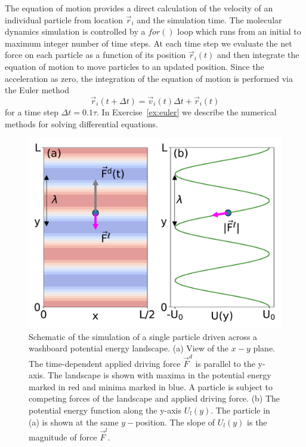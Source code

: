\documentclass[twocolumn,preprintnumbers,amsmath,amssymb,aps,prx]{revtex4}
\begin{document}
The equation of motion provides a direct calculation of the velocity
of an individual particle from location $\vec{r}_i$ %
and the simulation time.
The molecular dynamics simulation is controlled by a $for()$ loop
which runs from an initial to maximum integer number of time steps.
At each time step
we evaluate the net force on each particle as a function of its position
$\vec{r}_i(t)$
and then integrate
the equation of motion to move particles
to an updated position.
Since the acceleration as zero,
the integration of the equation of motion
is performed via 
the Euler method 
\begin{equation}
  \vec{r}_i(t+\Delta t) = \vec{v}_i(t) \Delta t + \vec{r}_i(t)
    \label{eq:euler}
\end{equation}
for a time step $\Delta t = 0.1 \tau$.
In %
Exercise~\ref{ex:euler}
we describe 
the numerical methods for 
solving differential equations.
%
\begin{figure} %
\centering
\includegraphics[width=\columnwidth]{landscape.pdf}
\caption{
  Schematic of the simulation of a single particle
  driven across a washboard potential energy landscape.
  (a) View of the $x-y$ plane. %
  The time-dependent applied driving force $\vec{F}^d$
  is parallel to the y-axis.
  The landscape is shown with %
  maxima in the potential energy marked in red
  and minima marked in blue.
  A particle is %
  subject to competing forces of the landscape and applied driving force.
  (b) The potential energy function
  along the y-axis $U_l(y)$.  
  The particle in (a) is shown at the same $y-$position.
  The slope of $U_l(y)$ is the 
  magnitude of force $\vec{F}^l$. 
  }
\label{fig:landscape0}
\end{figure}
\end{document}
